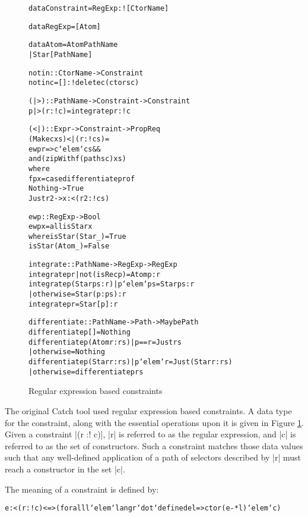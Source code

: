 \documentclass[preprint]{sigplanconf}
\newenvironment{code}{\begin{alltt}\small}{\end{alltt}}
\begin{document}
\begin{figure}
\begin{code}
data Constraint = RegExp :! [CtorName]

data RegExp = [Atom]

data Atom = Atom PathName
          | Star [PathName]

notin :: CtorName -> Constraint
notin c = [] :! delete c (ctors c)

(|>) :: PathName -> Constraint -> Constraint
p |> (r :! c) = integrate p r :! c

(<|) :: Expr -> Constraint -> Prop Req
(Make c xs) <| (r :! cs) =
    ewp r => c `elem` cs &&
    and (zipWith f (paths c) xs)
    where
    f p x = case differentiate p r of
                Nothing -> True
                Just r2 -> x :< (r2 :! cs)

ewp :: RegExp -> Bool
ewp x = all isStar x
   where isStar (Star _) = True
         isStar (Atom _) = False

integrate :: PathName -> RegExp -> RegExp
integrate p r | not (isRec p) = Atom p : r
integrate p (Star ps:r)  | p `elem` ps  = Star ps : r
                         | otherwise    = Star (p:ps) : r
integrate p r = Star [p] : r

differentiate :: PathName -> Path -> Maybe Path
differentiate p [] = Nothing
differentiate p (Atom  r:rs)  | p == r     = Just rs
                              | otherwise  = Nothing
differentiate p (Star  r:rs)  | p `elem` r  = Just (Star r:rs)
                              | otherwise   = differentiate p rs
\end{code}
\caption{Regular expression based constraints}
\label{fig:regexp}
\end{figure}

The original Catch tool used regular expression based constraints. A data type for the constraint, along with the essential operations upon it is given in Figure \ref{fig:regexp}. Given a constraint |(r :! c)|, |r| is referred to as the regular expression, and |c| is referred to as the set of constructors. Such a constraint matches those data values such that any well-defined application of a path of selectors described by |r| must reach a constructor in the set |c|.

The meaning of a constraint is defined by:

\begin{code}
e :< (r :! c) <=> (forall l `elem` lang r `dot` defined e l => ctor(e-*l) `elem` c)
\end{code}
\end{document}
